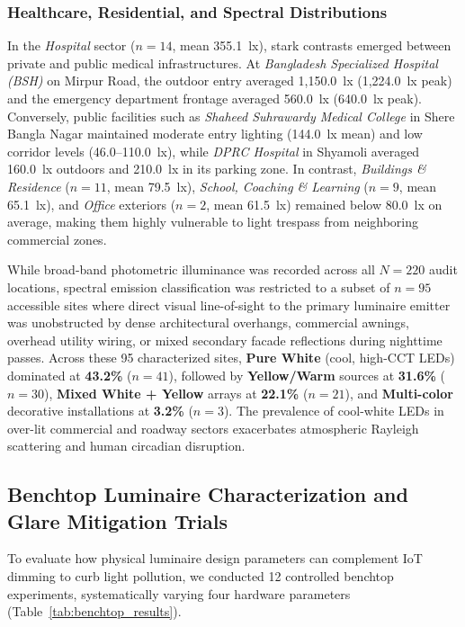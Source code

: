 \documentclass[11pt,a4paper]{article}
\begin{document}
\subsubsection{Healthcare, Residential, and Spectral Distributions}
In the \textit{Hospital} sector (\(n = 14\), mean 355.1~lx), stark contrasts emerged between private and public medical infrastructures. At \textit{Bangladesh Specialized Hospital (BSH)} on Mirpur Road, the outdoor entry averaged 1,150.0~lx (1,224.0~lx peak) and the emergency department frontage averaged 560.0~lx (640.0~lx peak). Conversely, public facilities such as \textit{Shaheed Suhrawardy Medical College} in Shere Bangla Nagar maintained moderate entry lighting (144.0~lx mean) and low corridor levels (46.0--110.0~lx), while \textit{DPRC Hospital} in Shyamoli averaged 160.0~lx outdoors and 210.0~lx in its parking zone. In contrast, \textit{Buildings \& Residence} (\(n = 11\), mean 79.5~lx), \textit{School, Coaching \& Learning} (\(n = 9\), mean 65.1~lx), and \textit{Office} exteriors (\(n = 2\), mean 61.5~lx) remained below 80.0~lx on average, making them highly vulnerable to light trespass from neighboring commercial zones.

While broad-band photometric illuminance was recorded across all \(N = 220\) audit locations, spectral emission classification was restricted to a subset of \(n = 95\) accessible sites where direct visual line-of-sight to the primary luminaire emitter was unobstructed by dense architectural overhangs, commercial awnings, overhead utility wiring, or mixed secondary facade reflections during nighttime passes. Across these 95 characterized sites, \textbf{Pure White} (cool, high-CCT LEDs) dominated at \textbf{43.2\%} (\(n = 41\)), followed by \textbf{Yellow/Warm} sources at \textbf{31.6\%} (\(n = 30\)), \textbf{Mixed White + Yellow} arrays at \textbf{22.1\%} (\(n = 21\)), and \textbf{Multi-color} decorative installations at \textbf{3.2\%} (\(n = 3\)). The prevalence of cool-white LEDs in over-lit commercial and roadway sectors exacerbates atmospheric Rayleigh scattering and human circadian disruption.

\subsection{Benchtop Luminaire Characterization and Glare Mitigation Trials}
To evaluate how physical luminaire design parameters can complement IoT dimming to curb light pollution, we conducted 12 controlled benchtop experiments, systematically varying four hardware parameters (Table~\ref{tab:benchtop_results}).
\end{document}
